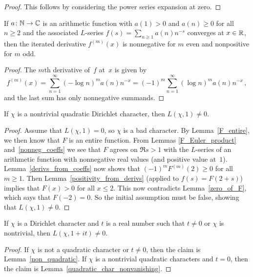 \begin{proof}
  \leanok
  This follows by considering the power series expansion at zero.
\end{proof}

\begin{lemma} \label{derivs_from_coeffs}
  \leanok
  If $a \colon \mathbb{N} \to \mathbb{C}$ is an arithmetic function with $a(1) > 0$ and $a(n) \ge 0$ for all $n \ge 2$
  and the associated $L$-series $f(s) = \sum_{n \ge 1} a(n) n^{-s}$ converges at $x \in \mathbb{R}$, then
  the iterated derivative $f^{(m)}(x)$ is nonnegative for $m$ even and nonpositive for $m$ odd.
\end{lemma}

\begin{proof}
  \leanok
  The $m$th derivative of~$f$ at~$x$ is given by
  \[ f^{(m)}(x) = \sum_{n=1}^\infty (-\log n)^m a(n) n^{-x} = (-1)^m \sum_{n=1}^\infty (\log n)^m a(n) n^{-x} \,, \]
  and the last sum has only nonnegative summands.
\end{proof}

\begin{lemma} \label{quadratic_char_nonvanishing}
  \leanok
  If $\chi$ is a nontrivial quadratic Dirichlet character, then $L(\chi, 1) \ne 0$.
\end{lemma}

\begin{proof}
  \leanok
  Assume that $L(\chi, 1) = 0$, so $\chi$ is a bad character. By Lemma~\ref{F_entire}, we then know
  that $F$ is an entire function. From Lemmas \ref{F_Euler_product} and~\ref{nonneg_coeffs} we see
  that $F$ agrees on $\Re s > 1$ with the $L$-series of an arithmetic function with nonnegative
  real values (and positive value at~$1$). Lemma~\ref{derivs_from_coeffs} now shows that
  $(-1)^m F^{(m)}(2) \ge 0$ for all~$m \ge 1$. Then Lemma~\ref{positivity_from_derivs}
  (applied to $f(s) = F(2+s)$) implies that $F(x) > 0$ for all $x \le 2$. This now
  contradicts Lemma~\ref{zero_of_F}, which says that $F(-2) = 0$. So the initial assumption
  must be false, showing that $L(\chi, 1) \ne 0$.
\end{proof}

\begin{theorem} \label{dirichlet_char_nonvanishing}
  \leanok
  If $\chi$ is a Dirichlet character and $t$ is a real number such that $t \ne 0$
  or $\chi$ is nontrivial, then $L(\chi, 1 + it) \ne 0$.
\end{theorem}

\begin{proof}
  \leanok
  If $\chi$ is not a quadratic character or $t \ne 0$, then the claim is Lemma~\ref{non_quadratic}.
  If $\chi$ is a nontrivial quadratic characters and $t = 0$, then the claim is Lemma~\ref{quadratic_char_nonvanishing}.
\end{proof}
